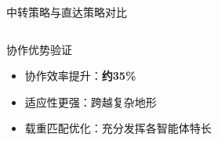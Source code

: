\documentclass[
10pt,
aspectratio=169,
]{beamer}
\begin{document}
\begin{frame}{中转策略与直达策略对比}
\begin{columns}
\begin{column}{0.4\textwidth}
            \begin{exampleblock}{协作优势验证}
                \begin{itemize}
                    \item 协作效率提升：\textbf{约35\%}
                    \item 适应性更强：跨越复杂地形
                    \item 载重匹配优化：充分发挥各智能体特长
                \end{itemize}
            \end{exampleblock}
        \end{column}
    \end{columns}
\end{frame}

            
            
\end{document}
